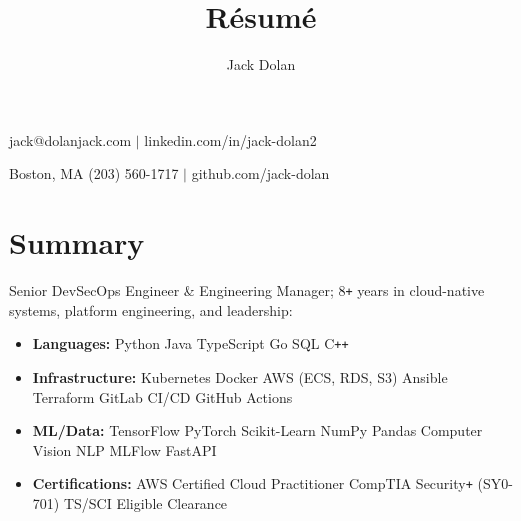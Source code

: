 \documentclass{article}
\makeatletter
\renewcommand{\maketitle}{ 
{\huge\bfseries\theauthor}\hfill jack@dolanjack.com $|$ linkedin.com/in/jack-dolan2

\vspace{0.2em} 

Boston, MA \hfill (203) 560-1717 $|$ github.com/jack-dolan
}
\makeatother
\begin{document}
 
\title{R\'esum\'e} 
\author{Jack Dolan} 
\maketitle
{}


\section{Summary}
\hspace*{-0.4cm}Senior DevSecOps Engineer \& Engineering Manager; 8\verb!+! years in cloud-native systems, platform engineering, and leadership:
    \begin{itemize}
    \itemsep0em
    \item \textbf{Languages:} Python \text{\textbar} Java \text{\textbar} TypeScript \text{\textbar} Go \text{\textbar} SQL \text{\textbar} C\verb!++!
    \item \textbf{Infrastructure:} Kubernetes \text{\textbar} Docker \text{\textbar} AWS (ECS, RDS, S3) \text{\textbar} Ansible \text{\textbar} Terraform \text{\textbar} GitLab CI/CD \text{\textbar} GitHub Actions
    \item \textbf{ML/Data:} TensorFlow \text{\textbar} PyTorch \text{\textbar} Scikit-Learn \text{\textbar} NumPy \text{\textbar} Pandas \text{\textbar} Computer Vision \text{\textbar} NLP \text{\textbar} MLFlow \text{\textbar} FastAPI
    \item \textbf{Certifications:} AWS Certified Cloud Practitioner \text{\textbar} CompTIA Security\verb!+! (SY0-701) \text{\textbar} TS/SCI Eligible Clearance \end{itemize}  

\end{document}
